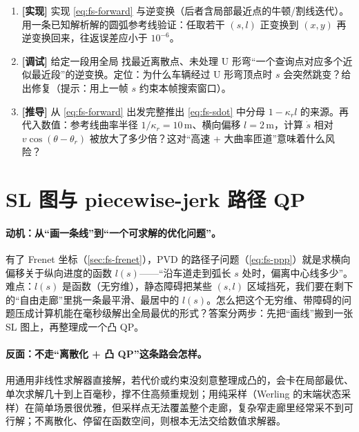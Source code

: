 \begin{practice}
\begin{enumerate}
  \item \textbf{[实现]} 实现 \cref{eq:fs-forward} 与逆变换（后者含局部最近点的牛顿/割线迭代）。用一条已知解析解的圆弧参考线验证：任取若干 $(s,l)$ 正变换到 $(x,y)$ 再逆变换回来，往返误差应小于 $10^{-6}$。
  \item \textbf{[调试]} 给定一段用全局 \verb@argmin@ 找最近离散点、未处理 U 形弯“一个查询点对应多个近似最近段”的逆变换。定位：为什么车辆经过 U 形弯顶点时 $s$ 会突然跳变？给出修复（提示：用上一帧 $s$ 约束本帧搜索窗口）。
  \item \textbf{[推导]} 从 \cref{eq:fs-forward} 出发完整推出 \cref{eq:fs-sdot} 中分母 $1-\kappa_r l$ 的来源。再代入数值：参考线曲率半径 $1/\kappa_r=10\,\mathrm{m}$、横向偏移 $l=2\,\mathrm{m}$，计算 $\dot s$ 相对 $v\cos(\theta-\theta_r)$ 被放大了多少倍？这对“高速 + 大曲率匝道”意味着什么风险？
\end{enumerate}
\end{practice}

\section{SL 图与 piecewise-jerk 路径 QP}
\label{sec:fs-sl}

\paragraph{动机：从“画一条线”到“一个可求解的优化问题”。}
有了 Frenet 坐标（\cref{sec:fs-frenet}），PVD 的路径子问题（\cref{eq:fs-ppp}）就是求横向偏移关于纵向进度的函数 $l(s)$——“沿车道走到弧长 $s$ 处时，偏离中心线多少”。难点：$l(s)$ 是函数（无穷维），静态障碍把某些 $(s,l)$ 区域挡死，我们要在剩下的“自由走廊”里挑一条最平滑、最居中的 $l(s)$。怎么把这个无穷维、带障碍的问题压成计算机能在毫秒级解出全局最优的形式？答案分两步：先把“画线”搬到一张 SL 图上，再整理成一个凸 QP。

\paragraph{反面：不走“离散化 + 凸 QP”这条路会怎样。}
用通用非线性求解器直接解，若代价或约束没刻意整理成凸的，会卡在局部最优、单次求解几十到上百毫秒，撑不住高频重规划；用纯采样（Werling 的末端状态采样\cite{werling2010frenet}）在简单场景很优雅，但采样点无法覆盖整个走廊，复杂窄走廊里经常采不到可行解；不离散化、停留在函数空间，则根本无法交给数值求解器。

